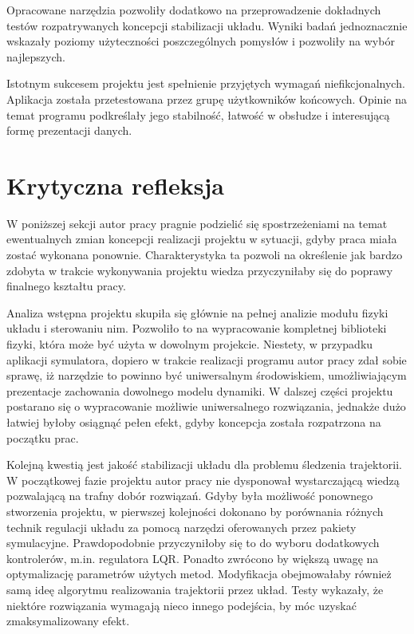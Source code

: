 \documentclass[12pt, oneside]{report}
\theoremstyle{definition}
\begin{document}
Opracowane narzędzia pozwoliły dodatkowo na przeprowadzenie dokładnych testów rozpatrywanych koncepcji stabilizacji układu. Wyniki badań jednoznacznie wskazały poziomy użyteczności poszczególnych pomysłów i pozwoliły na wybór najlepszych.

Istotnym sukcesem projektu jest spełnienie przyjętych wymagań niefikcjonalnych. Aplikacja została przetestowana przez grupę użytkowników końcowych. Opinie na temat programu podkreślały jego stabilność, łatwość w obsłudze i interesującą formę prezentacji danych.

\section{Krytyczna refleksja}
W poniższej sekcji autor pracy pragnie podzielić się spostrzeżeniami na temat ewentualnych zmian koncepcji realizacji projektu w sytuacji, gdyby praca miała zostać wykonana ponownie. Charakterystyka ta pozwoli na określenie jak bardzo zdobyta w trakcie wykonywania projektu wiedza przyczyniłaby się do poprawy finalnego kształtu pracy. 

Analiza wstępna projektu skupiła się głównie na pełnej analizie modułu fizyki układu i sterowaniu nim. Pozwoliło to na wypracowanie kompletnej biblioteki fizyki, która może być użyta w dowolnym projekcie. Niestety, w przypadku aplikacji symulatora, dopiero w trakcie realizacji programu autor pracy zdał sobie sprawę, iż narzędzie to powinno być uniwersalnym środowiskiem, umożliwiającym prezentacje zachowania dowolnego modelu dynamiki. W dalszej części projektu postarano się o wypracowanie możliwie uniwersalnego rozwiązania, jednakże dużo łatwiej byłoby osiągnąć pełen efekt, gdyby koncepcja została rozpatrzona na początku prac. 

Kolejną kwestią jest jakość stabilizacji układu dla problemu śledzenia trajektorii. W początkowej fazie projektu autor pracy nie dysponował wystarczającą wiedzą pozwalającą na trafny dobór rozwiązań. Gdyby była możliwość ponownego stworzenia projektu, w pierwszej kolejności dokonano by porównania różnych technik regulacji układu za pomocą narzędzi oferowanych przez pakiety symulacyjne. Prawdopodobnie przyczyniłoby się to do wyboru dodatkowych kontrolerów, m.in. regulatora LQR. Ponadto zwrócono by większą uwagę na optymalizację parametrów użytych metod. Modyfikacja obejmowałaby również samą ideę algorytmu realizowania trajektorii przez układ. Testy wykazały, że niektóre rozwiązania wymagają nieco innego podejścia, by móc uzyskać zmaksymalizowany efekt. 
\end{document}
